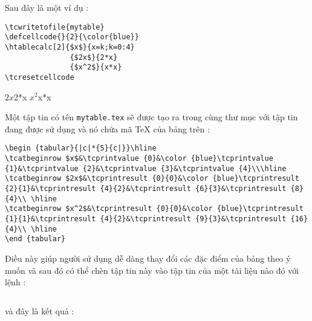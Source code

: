 \documentclass[a4paper,10pt]{article}
\newcommand\mywidth{0.85\linewidth}
\begin{document}
Sau đây là một ví dụ :
\begin{center}
\begin{minipage}{\mywidth}
\begin{lstlisting}
\tcwritetofile{mytable}
\defcellcode{}{2}{\color{blue}}
\htablecalc[2]{$x$}{x=k;k=0:4}
               {$2x$}{2*x}
               {$x^2$}{x*x}
\tcresetcellcode
\end{lstlisting}
\end{minipage}
\end{center}
               {$2x$}{2*x}
               {$x^2$}{x*x}
\tcresetcellcode

Một tập tin có tên \verb=mytable.tex= sẽ được tạo ra trong cùng thư mục với tập tin đang được sử dụng và nó chứa mã \TeX{} của bảng trên :
\begin{center}
\begin{minipage}{\mywidth}
\begin{lstlisting}
\begin {tabular}{|c|*{5}{c|}}\hline
\tcatbeginrow $x$&\tcprintvalue {0}&\color {blue}\tcprintvalue {1}&\tcprintvalue {2}&\tcprintvalue {3}&\tcprintvalue {4}\\\hline
\tcatbeginrow $2x$&\tcprintresult {0}{0}&\color {blue}\tcprintresult {2}{1}&\tcprintresult {4}{2}&\tcprintresult {6}{3}&\tcprintresult {8}{4}\\ \hline
\tcatbeginrow $x^2$&\tcprintresult {0}{0}&\color {blue}\tcprintresult {1}{1}&\tcprintresult {4}{2}&\tcprintresult {9}{3}&\tcprintresult {16}{4}\\ \hline
\end {tabular}
\end{lstlisting}
\end{minipage}
\end{center}
Điều này giúp người sử dụng dễ dàng thay đổi các đặc điểm của bảng theo ý muốn và sau đó có thể chèn tập tin này vào tập tin của một tài liệu nào đó với lệnh :
\begin{center}
\begin{minipage}{\mywidth}
\begin{lstlisting}

\end{lstlisting}
\end{minipage}
\end{center}
và đây là kết quả :
\begin{center}

\end{center}
\end{document}
